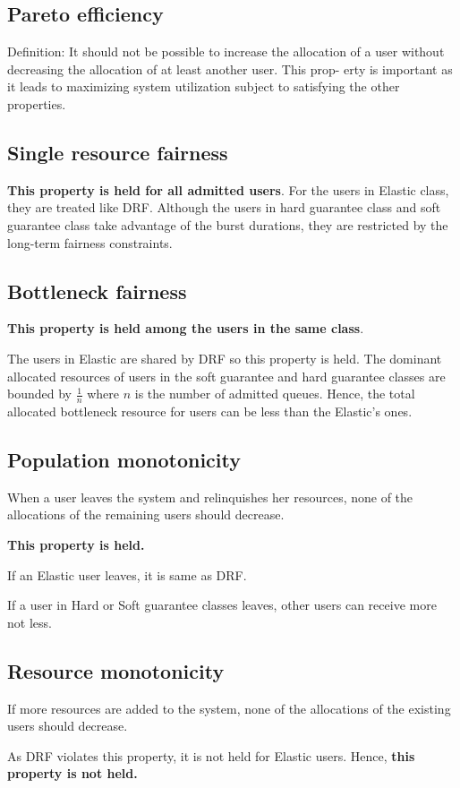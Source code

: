 \subsection{Pareto efficiency}

Definition: It should not be possible to increase the allocation of a user without decreasing the allocation of at least another user. This prop-
erty is important as it leads to maximizing system utilization subject to satisfying the other properties.

\subsection{Single resource fairness}

\textbf{This property is held for all admitted users}. For the users in Elastic class, they are treated like DRF. Although the users in hard guarantee class and soft guarantee class take advantage of the burst durations, they are restricted by the long-term fairness constraints.

\subsection{Bottleneck fairness}

\textbf{This property is held among the users in the same class}.

The users in Elastic are shared by DRF so this property is held. The dominant allocated resources of users in the soft guarantee and hard guarantee classes are bounded by $\frac{1}{n}$ where $n$ is the number of admitted queues. Hence, the total allocated bottleneck resource for \burstq users can be less than the Elastic's ones.

\subsection{Population monotonicity}

When a user leaves the system and relinquishes her resources, none of the
allocations of the remaining users should decrease.

\textbf{This property is held.}

If an Elastic user leaves, it is same as DRF.

If a user in Hard or Soft guarantee classes leaves, other users can receive more not less.

\subsection{Resource monotonicity}

If more resources are added to the system, none of the allocations of the existing users should decrease.

As DRF violates this property, it is not held for Elastic users. Hence, \textbf{this property is not held.}